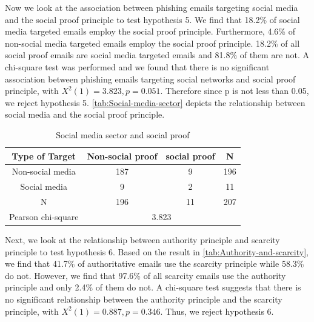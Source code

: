 Now we look at the association between phishing emails targeting social
media and the social proof principle to test hypothesis 5. We find
that 18.2\% of social media targeted emails employ the social proof
principle. Furthermore, 4.6\% of non-social media targeted emails
employ the social proof principle. 18.2\% of all social proof emails
are social media targeted emails and 81.8\% of them are not. A chi-square
test was performed and we found that there is no significant association
between phishing emails targeting social networks and social proof
principle, with $X^{2}(1)=3.823,p=0.051$. Therefore since p is not
less than 0.05, we reject hypothesis 5. \autoref{tab:Social-media-sector}
depicts the relationship between social media and the social proof
principle.

\begin{minipage}[t]{1\columnwidth}%
\begin{longtable}{cccc}
\caption{\label{tab:Social-media-sector}Social media sector and social proof}
\tabularnewline
\toprule 
{\footnotesize{}Type of Target} & {\footnotesize{}Non-social proof} & {\footnotesize{}social proof} & \multirow{1}{*}{{\footnotesize{}N}}\tabularnewline
\midrule 
\multirow{1}{*}{{\footnotesize{}Non-social media}} & {\footnotesize{}187} & {\footnotesize{}9} & \multirow{1}{*}{{\footnotesize{}196}}\tabularnewline
\midrule 
\multirow{1}{*}{{\footnotesize{}Social media}} & {\footnotesize{}9} & {\footnotesize{}2} & \multirow{1}{*}{{\footnotesize{}11}}\tabularnewline
\midrule
\midrule 
{\footnotesize{}N} & {\footnotesize{}196} & {\footnotesize{}11} & {\footnotesize{}207}\tabularnewline
\midrule
\midrule 
{\footnotesize{}Pearson chi-square} & \multicolumn{3}{c}{{\footnotesize{}3.823}}\tabularnewline
\midrule
\end{longtable}%
\end{minipage}

Next, we look at the relationship between authority principle and
scarcity principle to test hypothesis 6. Based on the result in \autoref{tab:Authority-and-scarcity},
we find that 41.7\% of authoritative emails use the scarcity principle
while 58.3\% do not. However, we find that 97.6\% of all scarcity
emails use the authority principle and only 2.4\% of them do not.
A chi-square test suggests that there is no significant relationship
between the authority principle and the scarcity principle, with $X^{2}(1)=0.887,p=0.346$.
Thus, we reject hypothesis 6.

